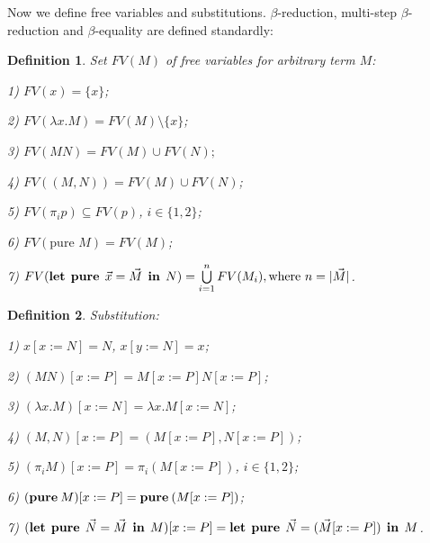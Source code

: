\documentclass[a4paper]{article}
\newtheorem{defin}{Definition}
\begin{document}
\begin{prooftree}
\end{prooftree}

  \vspace{\baselineskip}

  Now we define free variables and substitutions. $\beta$-reduction, multi-step $\beta$-reduction and $\beta$-equality are defined standardly:

  \begin{defin} Set $FV(M)$ of free variables for arbitrary term $M$:

  1) $FV(x) = \{ x \}$;

  2) $FV(\lambda x. M) = FV(M) \setminus \{ x\}$;

  3) $FV(M N) = FV(M) \cup FV(N);$

  4) $FV((M,N)) = FV(M) \cup FV(N)$;

  5) $FV(\pi_i p) \subseteq FV(p)$, $i \in \{ 1, 2\}$;

  6) $FV(\text{pure } M) = FV(M)$;

  7) $FV({\bf let \:\: pure} \:\: \vec{x} = \vec{M} \:\: {\bf in} \:\: N) = \bigcup \limits_{i = 1}^n FV(M_i), \text{where $n = |\vec{M}|$}$.
  \end{defin}

  \begin{defin} Substitution:

  1) $x [x := N] = N$, $x [y := N] = x$;

  2) $(M N) [x := P] = M[x := P] N [x := P]$;

  3) $(\lambda x. M) [x := N] = \lambda x. M [x := N]$;

  4) $(M, N)[x := P] = (M[x := P], N [x := P])$;

  5) $(\pi_i M) [x := P] = \pi_i (M[x := P])$, $i \in \{ 1, 2\}$;

  6) $({\bf pure \: } M) [x := P] = {\bf pure \: } (M [x := P])$;

  7) $({\bf let \:\: pure} \:\: \vec{N} = \vec{M} \:\: {\bf in} \:\: M) [x := P] = {\bf let \:\: pure} \:\: \vec{N} = (\vec{M} [x := P]) \:\: {\bf in} \:\: M$.
  \end{defin}
\end{document}
